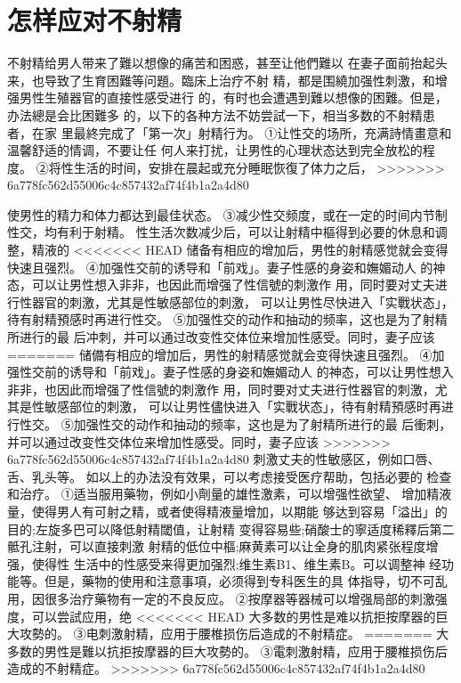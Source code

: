 \documentclass[12pt,UTF8]{ctexbook}
\begin{document}
\section{怎样应对不射精}
不射精给男人带来了難以想像的痛苦和困惑，甚至让他們難以
在妻子面前抬起头来，也导致了生育困難等问題。臨床上治疗不射
精，都是围繞加强性刺激，和增强男性生殖器官的直接性感受进行
的，有时也会遭遇到難以想像的困難。但是，办法總是会比困難多
的，以下的各种方法不妨尝試一下，相当多数的不射精患者，在家
里最終完成了「第一次」射精行为。
①让性交的场所，充满詩情畫意和温馨舒适的情调，不要让任
何人来打扰，让男性的心理状态达到完全放松的程度。
②将性生活的时间，安排在晨起或充分睡眠恢復了体力之后，
>>>>>>> 6a778fc562d55006c4c857432af74f4b1a2a4d80

使男性的精力和体力都达到最佳状态。
③减少性交频度，或在一定的时间内节制性交，均有利于射精。
性生活次数减少后，可以让射精中樞得到必要的休息和调整，精液的
<<<<<<< HEAD
储备有相应的增加后，男性的射精感觉就会变得快速且强烈。
④加强性交前的诱导和「前戏」。妻子性感的身姿和嫵媚动人
的神态，可以让男性想入非非，也因此而增强了性信號的刺激作
用，同时要对丈夫进行性器官的刺激，尤其是性敏感部位的刺激，
可以让男性尽快进入「实戰状态」，待有射精預感时再进行性交。
⑤加强性交的动作和抽动的频率，这也是为了射精所进行的最
后冲刺，并可以通过改变性交体位来增加性感受。同时，妻子应该
=======
储備有相应的增加后，男性的射精感觉就会变得快速且强烈。
④加强性交前的诱导和「前戏」。妻子性感的身姿和嫵媚动人
的神态，可以让男性想入非非，也因此而增强了性信號的刺激作
用，同时要对丈夫进行性器官的刺激，尤其是性敏感部位的刺激，
可以让男性儘快进入「实戰状态」，待有射精預感时再进行性交。
⑤加强性交的动作和抽动的频率，这也是为了射精所进行的最
后衝刺，并可以通过改变性交体位来增加性感受。同时，妻子应该
>>>>>>> 6a778fc562d55006c4c857432af74f4b1a2a4d80
刺激丈夫的性敏感区，例如口唇、舌、乳头等。
如以上的办法没有效果，可以考虑接受医疗帮助，包括必要的
检查和治疗。
①适当服用藥物，例如小劑量的雄性激素，可以增强性欲望、
增加精液量，使得男人有可射之精，或者使得精液量增加，以期能
够达到容易「溢出」的目的;左旋多巴可以降低射精閾值，让射精
变得容易些;硝酸士的寧适度稀釋后第二骶孔注射，可以直接刺激
射精的低位中樞;麻黄素可以让全身的肌肉紧张程度增强，使得性
生活中的性感受来得更加强烈;维生素B1、维生素B。可以调整神
经功能等。但是，藥物的使用和注意事項，必须得到专科医生的具
体指导，切不可乱用，因很多治疗藥物有一定的不良反应。
②按摩器等器械可以增强局部的刺激强度，可以尝試应用，绝
<<<<<<< HEAD
大多数的男性是难以抗拒按摩器的巨大攻勢的。
③电刺激射精，应用于腰椎损伤后造成的不射精症。
=======
大多数的男性是難以抗拒按摩器的巨大攻勢的。
③電刺激射精，应用于腰椎损伤后造成的不射精症。
>>>>>>> 6a778fc562d55006c4c857432af74f4b1a2a4d80
\end{document}
